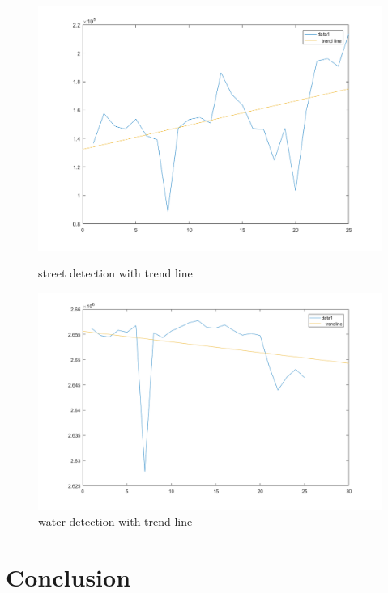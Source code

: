 \begin{figure}[h!]
\centering
\begin{minipage}{.5\textwidth}
	\centering
	\includegraphics[width=\textwidth-3em]{code/imagedata/analysis/street_analysis}
	\caption{street detection with trend line}
	\label{fig:analysstreet}
\end{minipage}%
\begin{minipage}{.5\textwidth}
	\centering
	\includegraphics[width=\textwidth-3em]{code/imagedata/analysis/water_analysis}
	\caption{water detection with trend line}
	\label{fig:analyswater}
\end{minipage}
\end{figure}



\section{Conclusion}

